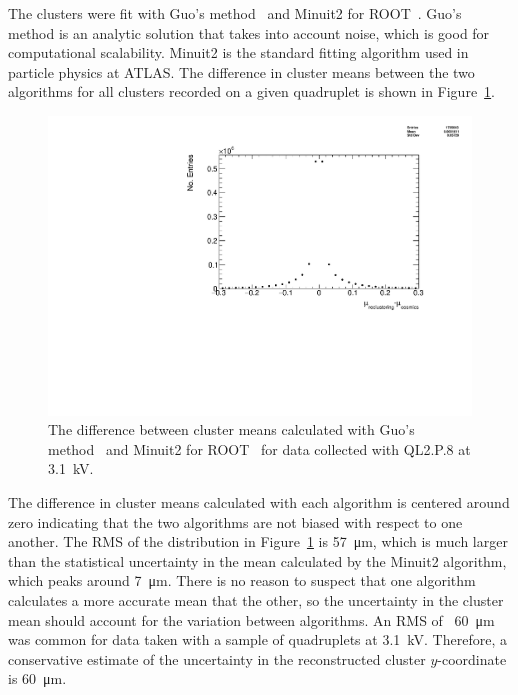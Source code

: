 The clusters were fit with Guo's method~\cite{guo_simple_2011} and Minuit2 for ROOT~\cite{hatlo_developments_2005}. Guo's method is an analytic solution that takes into account noise, which is good for computational scalability. Minuit2 is the standard fitting algorithm used in particle physics at ATLAS. The difference in cluster means between the two algorithms for all clusters recorded on a given quadruplet is shown in Figure~\ref{fig:mu_reclustering_minus_mu_cosmics}.

\begin{figure}
    \centering
    \includegraphics[width = \textwidth]{figures/figure_QL2P08_3100V_2021-05-21_reclustering_plots_mu_reclustering_minus_mu_cosmics.pdf}
    \caption{The difference between cluster means calculated with Guo's method~\cite{guo_simple_2011} and Minuit2 for ROOT~\cite{hatlo_developments_2005} for data collected with QL2.P.8 at \SI{3.1}{kV}.}
    \label{fig:mu_reclustering_minus_mu_cosmics}
\end{figure}

The difference in cluster means calculated with each algorithm is centered around zero indicating that the two algorithms are not biased with respect to one another. The RMS of the distribution in Figure~\ref{fig:mu_reclustering_minus_mu_cosmics} is \SI{57}{\micro\meter}, which is much larger than the statistical uncertainty in the mean calculated by the Minuit2 algorithm, which peaks around \SI{7}{\micro\meter}. There is no reason to suspect that one algorithm calculates a more accurate mean that the other, so the uncertainty in the cluster mean should account for the variation between algorithms. An RMS of ~\SI{60}{\micro\meter} was common for data taken with a sample of quadruplets at \SI{3.1}{kV}. Therefore, a conservative estimate of the uncertainty in the reconstructed cluster $y$-coordinate is \SI{60}{\micro\meter}.

